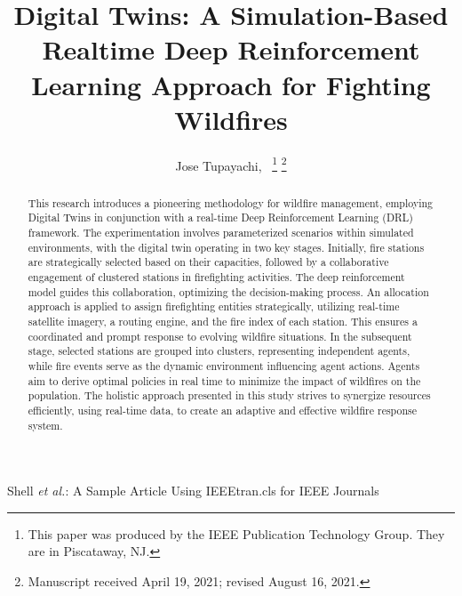\documentclass[lettersize,journal]{IEEEtran}
\begin{document}
\title{Digital Twins: A Simulation-Based Realtime Deep Reinforcement Learning Approach for Fighting Wildfires}

\author{Jose Tupayachi,~
\thanks{This paper was produced by the IEEE Publication Technology Group. They are in Piscataway, NJ.}%
\thanks{Manuscript received April 19, 2021; revised August 16, 2021.}}

%
{Shell \MakeLowercase{\textit{et al.}}: A Sample Article Using IEEEtran.cls for IEEE Journals}


\maketitle

\begin{abstract}
  This research introduces a pioneering methodology for wildfire management, employing Digital Twins in conjunction with a real-time Deep Reinforcement Learning (DRL) framework. The experimentation involves parameterized scenarios within simulated environments, with the digital twin operating in two key stages. Initially, fire stations are strategically selected based on their capacities, followed by a collaborative engagement of clustered stations in firefighting activities. The deep reinforcement model guides this collaboration, optimizing the decision-making process. An allocation approach is applied to assign firefighting entities strategically, utilizing real-time satellite imagery, a routing engine, and the fire index of each station. This ensures a coordinated and prompt response to evolving wildfire situations. In the subsequent stage, selected stations are grouped into clusters, representing independent agents, while fire events serve as the dynamic environment influencing agent actions. Agents aim to derive optimal policies in real time to minimize the impact of wildfires on the population. The holistic approach presented in this study strives to synergize resources efficiently, using real-time data, to create an adaptive and effective wildfire response system.

\end{abstract}
\end{document}

